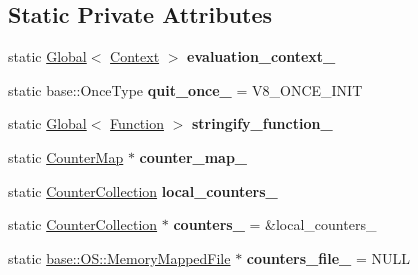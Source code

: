 \subsection*{Static Private Attributes}
\begin{DoxyCompactItemize}
\item 
static \hyperlink{classv8_1_1_global}{Global}$<$ \hyperlink{classv8_1_1_context}{Context} $>$ {\bfseries evaluation\+\_\+context\+\_\+}\hypertarget{classv8_1_1_shell_ac9e618d37d20075ed1b70e704ecc6e64}{}\label{classv8_1_1_shell_ac9e618d37d20075ed1b70e704ecc6e64}

\item 
static base\+::\+Once\+Type {\bfseries quit\+\_\+once\+\_\+} = V8\+\_\+\+O\+N\+C\+E\+\_\+\+I\+N\+IT\hypertarget{classv8_1_1_shell_a41e0618aad9f0eba818cb2c6923a6bf4}{}\label{classv8_1_1_shell_a41e0618aad9f0eba818cb2c6923a6bf4}

\item 
static \hyperlink{classv8_1_1_global}{Global}$<$ \hyperlink{classv8_1_1_function}{Function} $>$ {\bfseries stringify\+\_\+function\+\_\+}\hypertarget{classv8_1_1_shell_a1959e01e859955de7ff2953b266cf987}{}\label{classv8_1_1_shell_a1959e01e859955de7ff2953b266cf987}

\item 
static \hyperlink{classv8_1_1_counter_map}{Counter\+Map} $\ast$ {\bfseries counter\+\_\+map\+\_\+}\hypertarget{classv8_1_1_shell_ab9f883a0bbde53aaac3f404f0edfee8b}{}\label{classv8_1_1_shell_ab9f883a0bbde53aaac3f404f0edfee8b}

\item 
static \hyperlink{classv8_1_1_counter_collection}{Counter\+Collection} {\bfseries local\+\_\+counters\+\_\+}\hypertarget{classv8_1_1_shell_ab794dde4bb278559dce864d81d4e0e69}{}\label{classv8_1_1_shell_ab794dde4bb278559dce864d81d4e0e69}

\item 
static \hyperlink{classv8_1_1_counter_collection}{Counter\+Collection} $\ast$ {\bfseries counters\+\_\+} = \&local\+\_\+counters\+\_\+\hypertarget{classv8_1_1_shell_a080d20ce42351a91805f4351df005481}{}\label{classv8_1_1_shell_a080d20ce42351a91805f4351df005481}

\item 
static \hyperlink{classv8_1_1base_1_1_o_s_1_1_memory_mapped_file}{base\+::\+O\+S\+::\+Memory\+Mapped\+File} $\ast$ {\bfseries counters\+\_\+file\+\_\+} = N\+U\+LL\hypertarget{classv8_1_1_shell_a0b1b0c3fa7af5bb1cf2b337bc71642d5}{}\label{classv8_1_1_shell_a0b1b0c3fa7af5bb1cf2b337bc71642d5}


\end{DoxyCompactItemize}
